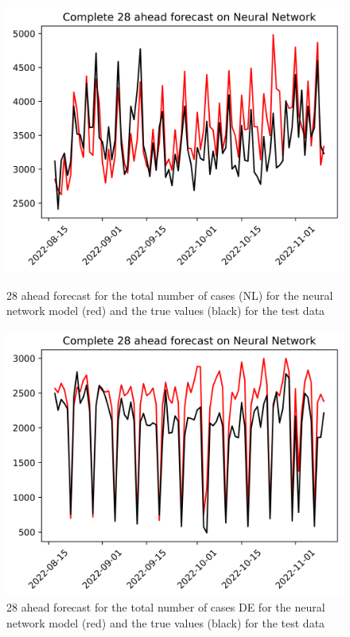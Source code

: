 \begin{figure}

\begin{minipage}{.45\textwidth}
  \centering
  \includegraphics[width=\linewidth]{pics/28_ah/Complete_28_ahead_Neural Network.png}
  \caption{28 ahead forecast for the total number of cases (NL) for the neural network model (red) and the true values (black) for the test data}
  \label{fig:tot_cases_fc_28_nn}
\end{minipage}
\begin{minipage}{.45\textwidth}
  \centering
  \includegraphics[width=\linewidth]{pics/28_ah/DE_Complete_28_ahead_Neural Network.png}
  \caption{28 ahead forecast for the total number of cases DE for the neural network model (red) and the true values (black) for the test data}
  \label{fig:tot_cases_fc_28_nn_DE}
\end{minipage}

\end{figure}
